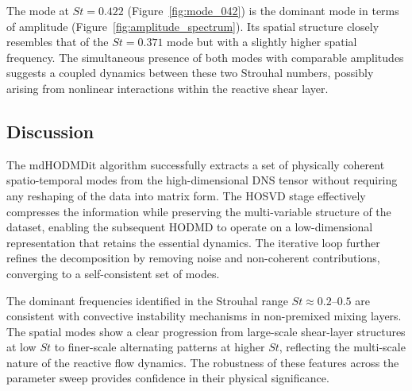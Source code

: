 The mode at $St = 0.422$ (Figure~\ref{fig:mode_042}) is the dominant mode in terms of amplitude (Figure~\ref{fig:amplitude_spectrum}). Its spatial structure closely resembles that of the $St = 0.371$ mode but with a slightly higher spatial frequency. The simultaneous presence of both modes with comparable amplitudes suggests a coupled dynamics between these two Strouhal numbers, possibly arising from nonlinear interactions within the reactive shear layer.
\FloatBarrier

\subsection{Discussion}

The mdHODMDit algorithm successfully extracts a set of physically coherent spatio-temporal modes from the high-dimensional DNS tensor without requiring any reshaping of the data into matrix form. The HOSVD stage effectively compresses the information while preserving the multi-variable structure of the dataset, enabling the subsequent HODMD to operate on a low-dimensional representation that retains the essential dynamics. The iterative loop further refines the decomposition by removing noise and non-coherent contributions, converging to a self-consistent set of modes.

The dominant frequencies identified in the Strouhal range $St \approx 0.2$--$0.5$ are consistent with convective instability mechanisms in non-premixed mixing layers. The spatial modes show a clear progression from large-scale shear-layer structures at low $St$ to finer-scale alternating patterns at higher $St$, reflecting the multi-scale nature of the reactive flow dynamics. The robustness of these features across the parameter sweep provides confidence in their physical significance.
